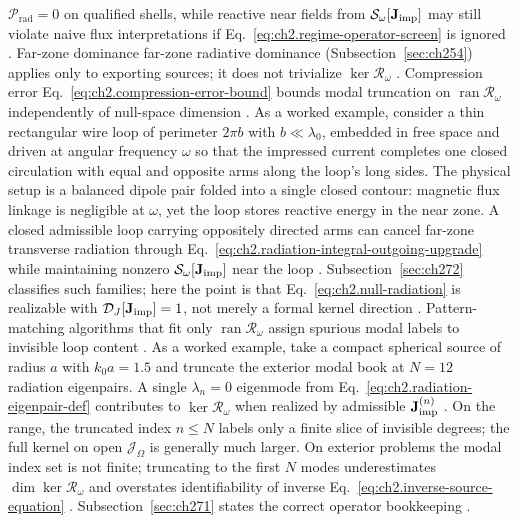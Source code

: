 \(\mathcal{P}_{\mathrm{rad}}=0\) on qualified shells, while reactive near fields from
\(\mathcal{S}_\omega[\mathbf{J}_{\mathrm{imp}}]\) may still violate naive flux interpretations if
Eq.~\eqref{eq:ch2.regime-operator-screen} is ignored \cite{stratton1941}.
Far-zone dominance far-zone radiative dominance (Subsection~\ref{sec:ch254}) applies only to
exporting sources; it does not trivialize \(\ker\mathcal{R}_\omega\) \cite{stratton1941}.
Compression error Eq.~\eqref{eq:ch2.compression-error-bound} bounds modal truncation on
\(\operatorname{ran}\mathcal{R}_\omega\) independently of null-space dimension
\cite{harrington2001}.
As a worked example, consider a thin rectangular wire loop of perimeter \(2\pi b\) with \(b\ll\lambda_0\), embedded in
free space and driven at angular frequency \(\omega\) so that the impressed current completes one
closed circulation with equal and opposite arms along the loop's long sides. The physical setup is
a balanced dipole pair folded into a single closed contour: magnetic flux linkage is negligible at
\(\omega\), yet the loop stores reactive energy in the near zone. A closed admissible loop carrying
oppositely directed arms can cancel far-zone transverse radiation through
Eq.~\eqref{eq:ch2.radiation-integral-outgoing-upgrade} while maintaining nonzero
\(\mathcal{S}_\omega[\mathbf{J}_{\mathrm{imp}}]\) near the loop \cite{stratton1941}.
Subsection~\ref{sec:ch272} classifies such families; here the point is that
Eq.~\eqref{eq:ch2.null-radiation} is realizable with
\(\mathcal{D}_{J}[\mathbf{J}_{\mathrm{imp}}]=1\), not merely a formal kernel direction
\cite{harrington2001}. Pattern-matching algorithms that fit only
\(\operatorname{ran}\mathcal{R}_\omega\) assign spurious modal labels to invisible loop content
\cite{stratton1941}.
As a worked example, take a compact spherical source of radius \(a\) with \(k_0 a=1.5\) and truncate the exterior modal
book at \(N=12\) radiation eigenpairs. A single \(\lambda_n=0\) eigenmode from
Eq.~\eqref{eq:ch2.radiation-eigenpair-def} contributes to \(\ker\mathcal{R}_\omega\) when
realized by admissible \(\mathbf{J}_{\mathrm{imp}}^{(n)}\) \cite{stratton1941}. On the range, the truncated
index \(n\le N\) labels only a finite slice of invisible degrees; the full kernel on open
\(\mathcal{J}_\Omega\) is generally much larger. On exterior problems the modal index set is not finite;
truncating to the first \(N\) modes underestimates \(\dim\ker\mathcal{R}_\omega\) and
overstates identifiability of inverse Eq.~\eqref{eq:ch2.inverse-source-equation}
\cite{harrington2001}. Subsection~\ref{sec:ch271} states the correct operator
bookkeeping \cite{stratton1941}.
